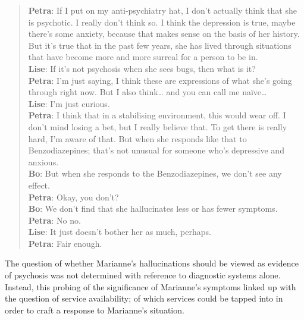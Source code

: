     \blockquote{\textnormal{\bfseries Petra}: 	If I put on my anti-psychiatry hat, I don’t actually think that she is psychotic. I really don’t think so. I think the depression is true, maybe there’s some anxiety, because that makes sense on the basis of her history. But it’s true that in the past few years, she has lived through situations that have become more and more surreal for a person to be in.
    \\\textnormal{\bfseries Lise}:	If it’s not psychosis when she sees bugs, then what is it?
    \\\textnormal{\bfseries Petra}: 	I’m just saying, I think these are expressions of what she’s going through right now. But I also think… and you can call me naïve…
    \\\textnormal{\bfseries Lise}: 	I’m just curious.
    \\\textnormal{\bfseries Petra}:	I think that in a stabilising environment, this would wear off. I don’t mind losing a bet, but I really believe that. To get there is really hard, I’m aware of that. But when she responds like that to Benzodiazepines; that’s not unusual for someone who’s depressive and anxious.
    \\\textnormal{\bfseries Bo}: 	But when she responds to the Benzodiazepines, we don’t see any effect.
    \\\textnormal{\bfseries Petra}: 	Okay, you don’t?
    \\\textnormal{\bfseries Bo}: We don’t find that she hallucinates less or has fewer symptoms.
    \\\textnormal{\bfseries Petra}: No no.
    \\\textnormal{\bfseries Lise}: It just doesn’t bother her as much, perhaps.
    \\\textnormal{\bfseries Petra}: Fair enough.}
The question of whether Marianne’s hallucinations should be viewed as evidence of psychosis was not determined with reference to diagnostic systems alone. Instead, this probing of the significance of Marianne’s symptoms linked up with the question of service availability; of which services could be tapped into in order to craft a response to Marianne’s situation.
\par

